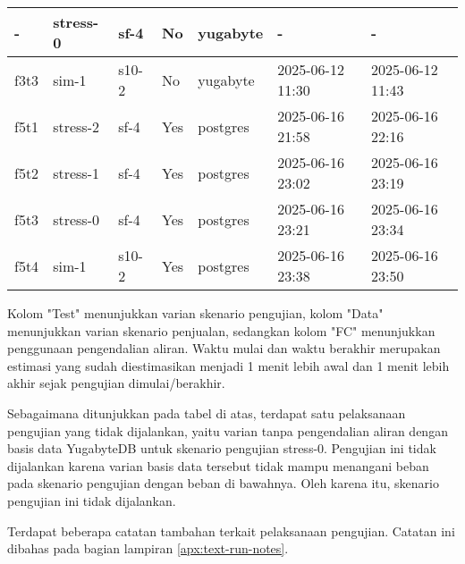 \begin{table}[htbp]
\begin{tabular}{|l|l|l|l|l|l|l|}
        -           & stress-0      & sf-4          & No          & yugabyte          & -                    & -                       \\ \hline
        f3t3        & sim-1         & s10-2         & No          & yugabyte          & 2025-06-12 11:30     & 2025-06-12 11:43        \\ \hline
        f5t1        & stress-2      & sf-4          & Yes         & postgres          & 2025-06-16 21:58     & 2025-06-16 22:16        \\ \hline
        f5t2        & stress-1      & sf-4          & Yes         & postgres          & 2025-06-16 23:02     & 2025-06-16 23:19        \\ \hline
        f5t3        & stress-0      & sf-4          & Yes         & postgres          & 2025-06-16 23:21     & 2025-06-16 23:34        \\ \hline
        f5t4        & sim-1         & s10-2         & Yes         & postgres          & 2025-06-16 23:38     & 2025-06-16 23:50        \\ \hline
    \end{tabular}
\end{table}

Kolom "Test" menunjukkan varian skenario pengujian, kolom "Data" menunjukkan varian skenario penjualan, sedangkan kolom "FC" menunjukkan penggunaan pengendalian aliran. Waktu mulai dan waktu berakhir merupakan estimasi yang sudah diestimasikan menjadi 1 menit lebih awal dan 1 menit lebih akhir sejak pengujian dimulai/berakhir.

Sebagaimana ditunjukkan pada tabel di atas, terdapat satu pelaksanaan pengujian yang tidak dijalankan, yaitu varian tanpa pengendalian aliran dengan basis data YugabyteDB untuk skenario pengujian stress-0. Pengujian ini tidak dijalankan karena varian basis data tersebut tidak mampu menangani beban pada skenario pengujian dengan beban di bawahnya. Oleh karena itu, skenario pengujian ini tidak dijalankan.

Terdapat beberapa catatan tambahan terkait pelaksanaan pengujian. Catatan ini dibahas pada bagian lampiran \ref{apx:text-run-notes}.
